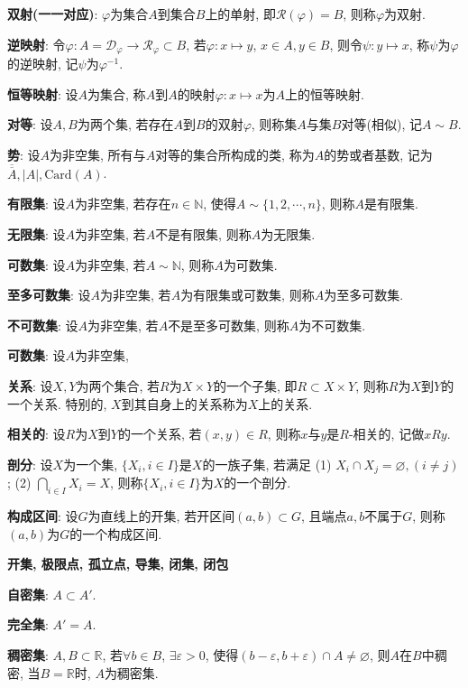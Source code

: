 \documentclass[12pt, a4paper, oneside]{ctexart}
\def\R{\mathbb{R}}          %
\def\N{\mathbb{N}}          %
\def\ol{\overline}          %
\begin{document}
\textbf{双射(一一对应)}: $\varphi$为集合$A$到集合$B$上的单射, 即$\mathcal{R}(\varphi) = B$, 则称$\varphi$为双射.

\textbf{逆映射}: 令$\varphi:A=\mathcal{D}_\varphi\to\mathcal{R}_\varphi\subset B$, 若$\varphi:x\mapsto y$, $x\in A, y\in B$, 则令$\psi:y\mapsto x$, 称$\psi$为$\varphi$的逆映射, 记$\psi$为$\varphi^{-1}$.

\textbf{恒等映射}: 设$A$为集合, 称$A$到$A$的映射$\varphi:x\mapsto x$为$A$上的恒等映射.

\textbf{对等}: 设$A,B$为两个集, 若存在$A$到$B$的双射$\varphi$, 则称集$A$与集$B$对等(相似), 记$A\sim B$.

\textbf{势}: 设$A$为非空集, 所有与$A$对等的集合所构成的类, 称为$A$的势或者基数, 记为$\ol{\ol{A}},|A|, \text{Card}(A)$.

\textbf{有限集}: 设$A$为非空集, 若存在$n\in\N$, 使得$A\sim\{1, 2,\cdots, n\}$, 则称$A$是有限集.

\textbf{无限集}: 设$A$为非空集, 若$A$不是有限集, 则称$A$为无限集.

\textbf{可数集}: 设$A$为非空集, 若$A\sim \N$, 则称$A$为可数集.

\textbf{至多可数集}: 设$A$为非空集, 若$A$为有限集或可数集, 则称$A$为至多可数集.

\textbf{不可数集}: 设$A$为非空集, 若$A$不是至多可数集, 则称$A$为不可数集.

\textbf{可数集}: 设$A$为非空集, 

\textbf{关系}: 设$X, Y$为两个集合, 若$R$为$X\times Y$的一个子集, 即$R\subset X\times Y$, 则称$R$为$X$到$Y$的一个关系. 特别的, $X$到其自身上的关系称为$X$上的关系.

\textbf{相关的}: 设$R$为$X$到$Y$的一个关系, 若$(x, y)\in R$, 则称$x$与$y$是$R$-相关的, 记做$xRy$.

\textbf{剖分}: 设$X$为一个集, $\{X_i,i\in I\}$是$X$的一族子集, 若满足 (1) $X_i\cap X_j = \varnothing, (i\neq j)$; (2) $\bigcap_{i\in I}X_i = X$, 则称$\{X_i,i\in I\}$为$X$的一个剖分.

\textbf{构成区间}: 设$G$为直线上的开集, 若开区间$(a, b)\subset G$, 且端点$a, b$不属于$G$, 则称$(a, b)$为$G$的一个构成区间.

\textbf{开集, 极限点, 孤立点, 导集, 闭集, 闭包}

\textbf{自密集}: $A\subset A'$.

\textbf{完全集}: $A'=A$.

\textbf{稠密集}: $A, B\subset \R$, 若$\forall b\in B$, $\exists \varepsilon > 0$, 使得$(b-\varepsilon, b+\varepsilon)\cap A\neq \varnothing$, 则$A$在$B$中稠密, 当$B=\R$时, $A$为稠密集.
\end{document}
